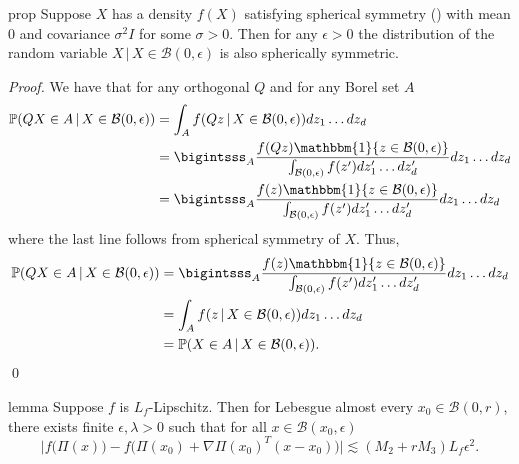 \documentclass[11pt]{article}
\begin{document}
\begin{restatable}{prop}{} \label{prop: conditional spherical symmetry}
    Suppose $X$ has a density $f(X)$ satisfying spherical symmetry () with mean $0$ and covariance $\sigma^2I$ for some $\sigma > 0$. Then for any $\epsilon > 0$ the distribution of the random variable $X \,| \, X \in \mathcal{B}(0, \epsilon)$ is also spherically symmetric. 
\end{restatable}
\noindent \textit{Proof.} We have that for any orthogonal $Q$ and for any Borel set $A$
\begin{align*}
    \mathbb{P}(QX \in A \, | \, X \in \mathcal{B}(0,\epsilon) ) &= \int_{A}f(Qz\,|\,X \in \mathcal{B}(0,\epsilon))dz_1\dots dz_d \\
    &= \bigintsss_{A}\frac{f(Qz) \mathbbm{1}\{z \in \mathcal{B}(0,\epsilon)\}}{\int_{\mathcal{B}(0,\epsilon)}f(z')dz'_1 \dots dz'_d}dz_1\dots dz_d \\
    &= \bigintsss_{A}\frac{f(z) \mathbbm{1}\{z \in \mathcal{B}(0,\epsilon)\}}{\int_{\mathcal{B}(0,\epsilon)}f(z')dz'_1 \dots dz'_d}dz_1\dots dz_d
\end{align*}
where the last line follows from spherical symmetry of $X$. Thus,
\begin{align*}
    \mathbb{P}(QX \in A \, | \, X \in \mathcal{B}(0,\epsilon) ) &= \bigintsss_{A}\frac{f(z) \mathbbm{1}\{z \in \mathcal{B}(0,\epsilon)\}}{\int_{\mathcal{B}(0,\epsilon)}f(z')dz'_1 \dots dz'_d}dz_1\dots dz_d \\
    &= \int_{A}f(z\,|\,X \in \mathcal{B}(0,\epsilon))dz_1\dots dz_d \\
    &= \mathbb{P}(X \in A \, | \, X \in \mathcal{B}(0,\epsilon) ).
\end{align*}
\qed{}

\begin{restatable}[Approximation]{lemma}{} \label{lemma: proj approx}
    Suppose $f$ is $L_f$-Lipschitz. Then for Lebesgue almost every $x_0 \in \mathcal{B}(0,r)$, there exists finite $\epsilon, \lambda > 0$ such that for all $x \in \mathcal{B}(x_0, \epsilon)$
    \[\bigg|f\big(\Pi(x)\big) - f\big(\Pi(x_0) + \nabla\Pi(x_0)^{T}(x-x_0) \big)\bigg| \lesssim (M_2+rM_3)L_f\epsilon^2. \]
\end{restatable}
\end{document}

